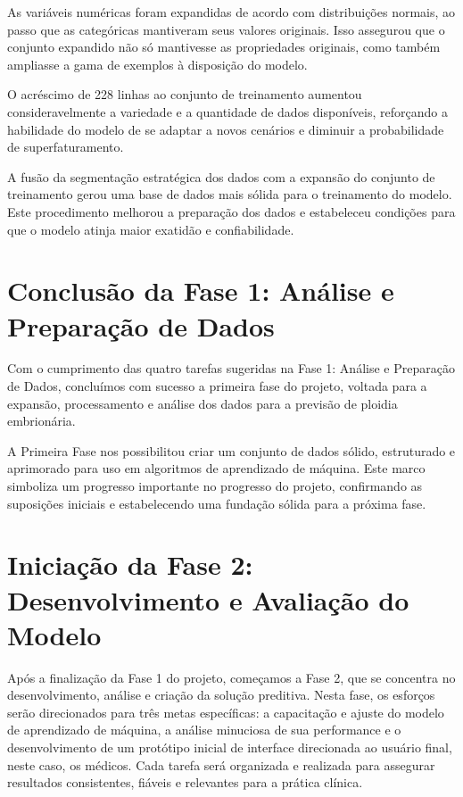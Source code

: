 As variáveis numéricas foram expandidas de acordo com distribuições normais, ao passo que as categóricas mantiveram seus valores originais. Isso assegurou que o conjunto expandido não só mantivesse as propriedades originais, como também ampliasse a gama de exemplos à disposição do modelo.

O acréscimo de 228 linhas ao conjunto de treinamento aumentou consideravelmente a variedade e a quantidade de dados disponíveis, reforçando a habilidade do modelo de se adaptar a novos cenários e diminuir a probabilidade de superfaturamento.

A fusão da segmentação estratégica dos dados com a expansão do conjunto de treinamento gerou uma base de dados mais sólida para o treinamento do modelo. Este procedimento melhorou a preparação dos dados e estabeleceu condições para que o modelo atinja maior exatidão e confiabilidade.

\section{Conclusão da Fase 1: Análise e Preparação de Dados}

Com o cumprimento das quatro tarefas sugeridas na Fase 1: Análise e Preparação de Dados, concluímos com sucesso a primeira fase do projeto, voltada para a expansão, processamento e análise dos dados para a previsão de ploidia embrionária.

A Primeira Fase nos possibilitou criar um conjunto de dados sólido, estruturado e aprimorado para uso em algoritmos de aprendizado de máquina. Este marco simboliza um progresso importante no progresso do projeto, confirmando as suposições iniciais e estabelecendo uma fundação sólida para a próxima fase.

\section{Iniciação da Fase 2: Desenvolvimento e Avaliação do Modelo}

Após a finalização da Fase 1 do projeto, começamos a Fase 2, que se concentra no desenvolvimento, análise e criação da solução preditiva. Nesta fase, os esforços serão direcionados para três metas específicas: a capacitação e ajuste do modelo de aprendizado de máquina, a análise minuciosa de sua performance e o desenvolvimento de um protótipo inicial de interface direcionada ao usuário final, neste caso, os médicos. Cada tarefa será organizada e realizada para assegurar resultados consistentes, fiáveis e relevantes para a prática clínica.

